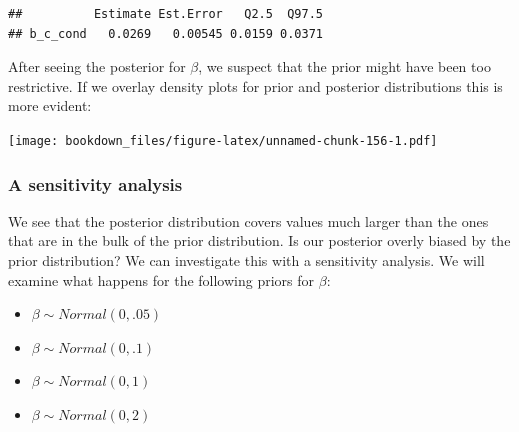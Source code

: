 \documentclass[12pt,]{krantz}
\newenvironment{Shaded}{\begin{snugshade}}{\end{snugshade}}
\newcommand{\KeywordTok}[1]{\textcolor[rgb]{0.13,0.29,0.53}{\textbf{#1}}}
\newcommand{\DataTypeTok}[1]{\textcolor[rgb]{0.13,0.29,0.53}{#1}}
\newcommand{\DecValTok}[1]{\textcolor[rgb]{0.00,0.00,0.81}{#1}}
\newcommand{\FloatTok}[1]{\textcolor[rgb]{0.00,0.00,0.81}{#1}}
\newcommand{\StringTok}[1]{\textcolor[rgb]{0.31,0.60,0.02}{#1}}
\newcommand{\CommentTok}[1]{\textcolor[rgb]{0.56,0.35,0.01}{\textit{#1}}}
\newcommand{\OperatorTok}[1]{\textcolor[rgb]{0.81,0.36,0.00}{\textbf{#1}}}
\newcommand{\NormalTok}[1]{#1}
\providecommand{\tightlist}{%
  \setlength{\itemsep}{0pt}\setlength{\parskip}{0pt}}
\theoremstyle{definition}
\theoremstyle{definition}
\theoremstyle{definition}
\theoremstyle{remark}
\begin{document}
\begin{verbatim}
##          Estimate Est.Error   Q2.5  Q97.5
## b_c_cond   0.0269   0.00545 0.0159 0.0371
\end{verbatim}

After seeing the posterior for \(\beta\), we suspect that the prior
might have been too restrictive. If we overlay density plots for prior
and posterior distributions this is more evident:

\begin{Shaded}
\end{Shaded}

\texttt{[image: bookdown\_files/figure-latex/unnamed-chunk-156-1.pdf]}

\subsubsection{A sensitivity analysis}\label{a-sensitivity-analysis}

We see that the posterior distribution covers values much larger than
the ones that are in the bulk of the prior distribution. Is our
posterior overly biased by the prior distribution? We can investigate
this with a sensitivity analysis. We will examine what happens for the
following priors for \(\beta\):

\begin{itemize}
\tightlist
\item
  \(\beta \sim Normal(0,.05)\)
\item
  \(\beta \sim Normal(0,.1)\)
\item
  \(\beta \sim Normal(0,1)\)
\item
  \(\beta \sim Normal(0,2)\)
\end{itemize}
\end{document}
